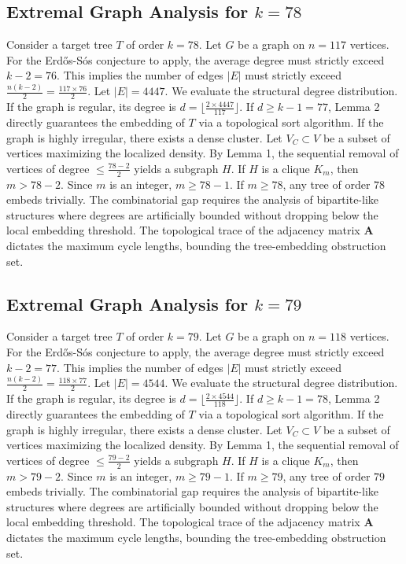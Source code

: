 \documentclass[11pt,a4paper]{article}
\begin{document}
\subsection{Extremal Graph Analysis for $k=78$}
Consider a target tree $T$ of order $k=78$.
Let $G$ be a graph on $n=117$ vertices.
For the Erd\H{o}s-S\'os conjecture to apply, the average degree must strictly exceed $k-2 = 76$.
This implies the number of edges $|E|$ must strictly exceed $\frac{n(k-2)}{2} = \frac{117 \times 76}{2}$.
Let $|E| = 4447$.
We evaluate the structural degree distribution. If the graph is regular, its degree is $d = \lfloor \frac{2 \times 4447}{117} \rfloor$.
If $d \geq k-1 = 77$, Lemma 2 directly guarantees the embedding of $T$ via a topological sort algorithm.
If the graph is highly irregular, there exists a dense cluster. Let $V_C \subset V$ be a subset of vertices maximizing the localized density.
By Lemma 1, the sequential removal of vertices of degree $\leq \frac{78-2}{2}$ yields a subgraph $H$.
If $H$ is a clique $K_{m}$, then $m > 78-2$. Since $m$ is an integer, $m \geq 78-1$. If $m \geq 78$, any tree of order $78$ embeds trivially.
The combinatorial gap requires the analysis of bipartite-like structures where degrees are artificially bounded without dropping below the local embedding threshold. The topological trace of the adjacency matrix $\mathbf{A}$ dictates the maximum cycle lengths, bounding the tree-embedding obstruction set.


\subsection{Extremal Graph Analysis for $k=79$}
Consider a target tree $T$ of order $k=79$.
Let $G$ be a graph on $n=118$ vertices.
For the Erd\H{o}s-S\'os conjecture to apply, the average degree must strictly exceed $k-2 = 77$.
This implies the number of edges $|E|$ must strictly exceed $\frac{n(k-2)}{2} = \frac{118 \times 77}{2}$.
Let $|E| = 4544$.
We evaluate the structural degree distribution. If the graph is regular, its degree is $d = \lfloor \frac{2 \times 4544}{118} \rfloor$.
If $d \geq k-1 = 78$, Lemma 2 directly guarantees the embedding of $T$ via a topological sort algorithm.
If the graph is highly irregular, there exists a dense cluster. Let $V_C \subset V$ be a subset of vertices maximizing the localized density.
By Lemma 1, the sequential removal of vertices of degree $\leq \frac{79-2}{2}$ yields a subgraph $H$.
If $H$ is a clique $K_{m}$, then $m > 79-2$. Since $m$ is an integer, $m \geq 79-1$. If $m \geq 79$, any tree of order $79$ embeds trivially.
The combinatorial gap requires the analysis of bipartite-like structures where degrees are artificially bounded without dropping below the local embedding threshold. The topological trace of the adjacency matrix $\mathbf{A}$ dictates the maximum cycle lengths, bounding the tree-embedding obstruction set.
\end{document}
